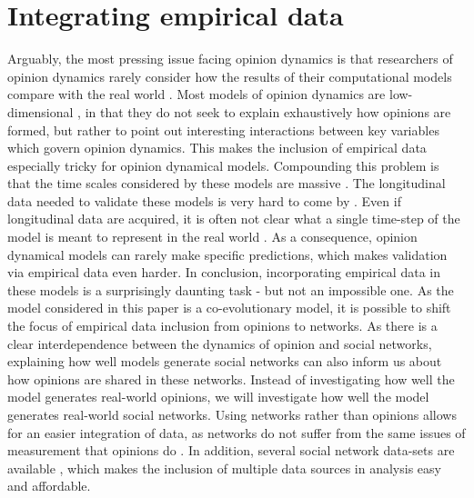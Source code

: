 \documentclass[11pt]{article}
\begin{document}
\part{Integrating empirical data}
Arguably, the most pressing issue facing opinion dynamics is that researchers of opinion dynamics rarely consider how the results of their computational models compare with the real world \cite{flache_between_2018}. Most models of opinion dynamics are low-dimensional \cite{bener_empirical_2016}, in that they do not seek to explain exhaustively how opinions are formed, but rather to point out interesting interactions between key variables which govern opinion dynamics. This makes the inclusion of empirical data especially tricky for opinion dynamical models. Compounding this problem is that the time scales considered by these models are massive \cite{flache_models_2017, galesic_integrating_2021}. The longitudinal data needed to validate these models is very hard to come by \cite{mas2019challenges, kossinets_origins_2009}. Even if longitudinal data are acquired, it is often not clear what a single time-step of the model is meant to represent in the real world \cite{mas2019challenges}. As a consequence, opinion dynamical models can rarely make specific predictions, which makes validation via empirical data even harder. In conclusion, incorporating empirical data in these models is a surprisingly daunting task - but not an impossible one. As the model considered in this paper is a co-evolutionary model, it is possible to shift the focus of empirical data inclusion from opinions to networks. As there is a clear interdependence between the dynamics of opinion and social networks, explaining how well models generate social networks can also inform us about how opinions are shared in these networks. Instead of investigating how well the model generates real-world opinions, we will investigate how well the model generates real-world social networks. Using networks rather than opinions allows for an easier integration of data, as networks do not suffer from the same issues of measurement that opinions do \cite{best2007measuring}. In addition, several social network data-sets are available \cite{rossi_network_2015}, which makes the inclusion of multiple data sources in analysis easy and affordable. 
\end{document}
